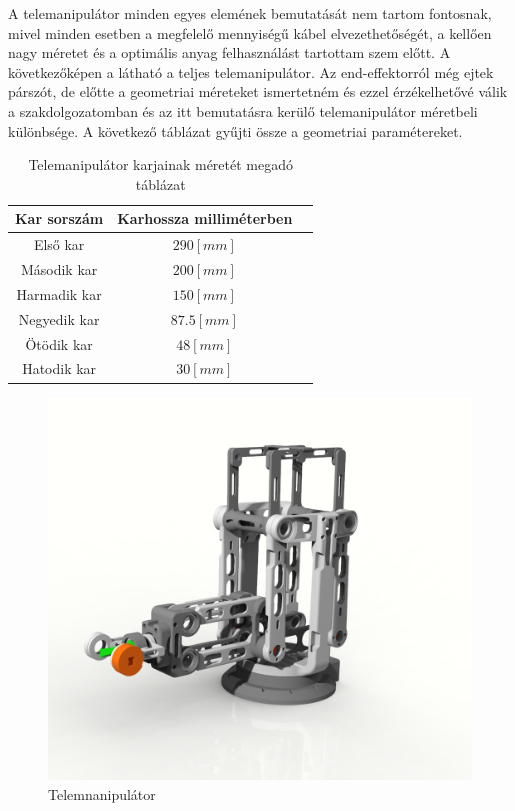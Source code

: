 A telemanipulátor minden egyes elemének bemutatását nem tartom fontosnak, mivel minden esetben a megfelelő mennyiségű kábel elvezethetőségét, a kellően nagy méretet és a optimális anyag felhasználást tartottam szem előtt. A következőképen a látható a teljes telemanipulátor. Az end-effektorról még ejtek párszót, de előtte a geometriai méreteket ismertetném és ezzel érzékelhetővé válik a szakdolgozatomban és az itt bemutatásra kerülő telemanipulátor méretbeli különbsége. A következő táblázat gyűjti össze a geometriai paramétereket.
\begin{table}[h!]
\centering
\begin{tabular}{ |c|c|c| }
 \hline
 Kar sorszám & Karhossza milliméterben  \\
 \hline
 Első kar & $290[mm]$  \\
 \hline
 Második kar & $200[mm]$  \\
 \hline
 Harmadik kar & $150[mm]$  \\
 \hline
 Negyedik kar & $87.5[mm]$  \\
 \hline
 Ötödik kar & $48[mm]$  \\
 \hline
 Hatodik kar & $30[mm]$  \\
\hline
\end{tabular}
\caption{Telemanipulátor karjainak méretét megadó táblázat}
\label{table:merettabla}
\end{table}

\begin{figure}[!ht]
\centering
\includegraphics[width=120mm, keepaspectratio]{figures/Diploma_CAD/creo1.png}
\caption{Telemnanipulátor}
\label{fig:Telemnanipulátor}
\end{figure}

